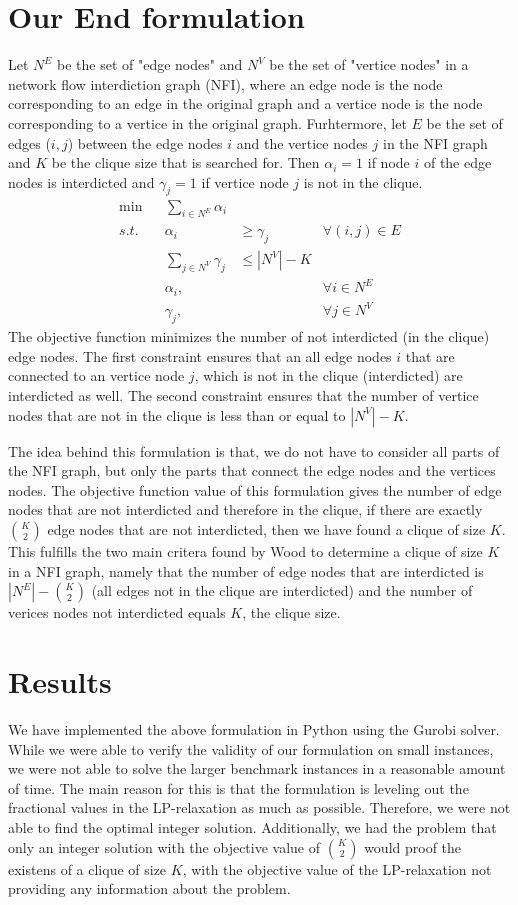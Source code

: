 \documentclass{article}
\begin{document}
\section{Our End formulation}
Let $N^E$ be the set of "edge nodes" and $N^V$ be the set of "vertice nodes" in a network flow interdiction graph (NFI), where an edge node is the node corresponding to an edge in the original graph and a vertice node is the node corresponding to a vertice in the original graph. Furhtermore, let $E$ be the set of edges ($i,j$) between the edge nodes $i$ and the vertice nodes $j$ in the NFI graph and $K$ be the clique size that is searched for. Then $\alpha_i = 1$ if node $i$ of the edge nodes is interdicted and $\gamma_j = 1$ if vertice node $j$ is not in the clique. 
\begin{align*}
     \min &  & \sum_{i \in N^E} \alpha_i  \\
     s.t. &  & \alpha_i &\geq \gamma_j & \forall (i,j) \in E \\
          &  & \sum_{j \in N^V} \gamma_j & \leq |N^V| - K \\
          &  & \alpha_i,  && \forall i \in N^E \\ 
          &  & \gamma_j,  & &\forall j \in N^V
\end{align*}
The objective function minimizes the number of not interdicted (in the clique) edge nodes. The first constraint ensures that an all edge nodes $i$ that are connected to an vertice node $j$, which is not in the clique (interdicted) are interdicted as well. The second constraint ensures that the number of vertice nodes that are not in the clique is less than or equal to $|N^V| - K$. 

The idea behind this formulation is that, we do not have to consider all parts of the NFI graph, but only the parts that connect the edge nodes and the vertices nodes. The objective function value of this formulation gives the number of edge nodes that are not interdicted and therefore in the clique, if there are exactly $\binom{K}{2}$ edge nodes that are not interdicted, then we have found a clique of size $K$. This fulfills the two main critera found by Wood to determine a clique of size $K$ in a NFI graph, namely that the number of edge nodes that are interdicted is $|N^E| - \binom{K}{2}$ (all edges not in the clique are interdicted) and the number of verices nodes not interdicted equals $K$, the clique size. 

\section{Results}
We have implemented the above formulation in Python using the Gurobi solver. While we were able to verify the validity of our formulation on small instances, we were not able to solve the larger benchmark instances in a reasonable amount of time. The main reason for this is that the formulation is leveling out the fractional values in the LP-relaxation as much as possible. Therefore, we were not able to find the optimal integer solution. Additionally, we had the problem that only an integer solution with the objective value of $\binom{K}{2}$ would proof the existens of a clique of size $K$, with the objective value of the LP-relaxation not providing any information about the problem. 
\end{document}
